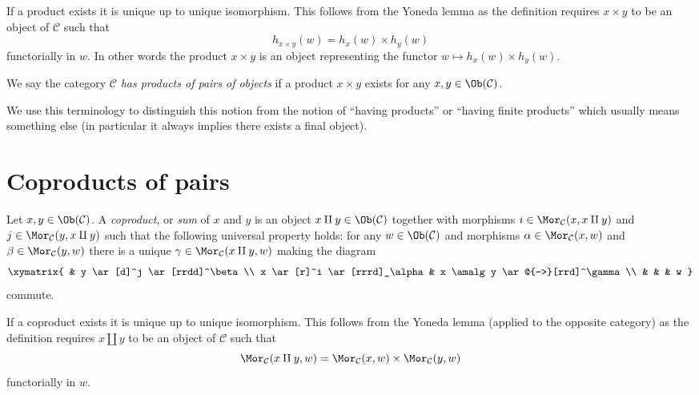 \noindent
If a product exists it is unique up to unique
isomorphism. This follows from the Yoneda lemma as
the definition requires $x \times y$ to be an object
of $\mathcal{C}$ such that
$$
h_{x \times y}(w) = h_x(w) \times h_y(w)
$$
functorially in $w$. In other words the product $x \times y$
is an object representing the functor
$w \mapsto h_x(w) \times h_y(w)$.

\begin{definition}
\label{definition-has-products-of-pairs}
We say the category $\mathcal{C}$ {\it has products of pairs
of objects} if a product $x \times y$
exists for any $x, y \in \Ob(\mathcal{C})$.
\end{definition}

\noindent
We use this terminology to distinguish this notion from the notion
of ``having products'' or ``having finite products'' which usually means
something else (in particular it always implies there exists a
final object).





\section{Coproducts of pairs}
\label{section-coproducts-pairs}

\begin{definition}
\label{definition-coproducts}
Let $x, y \in \Ob(\mathcal{C})$.
A {\it coproduct}, or {\it sum} of $x$ and $y$ is
an object $x \amalg y \in \Ob(\mathcal{C})$
together with morphisms
$i \in \Mor_{\mathcal C}(x, x \amalg y)$ and
$j \in \Mor_{\mathcal C}(y, x \amalg y)$ such
that the following universal property holds: for
any $w \in \Ob(\mathcal{C})$ and morphisms
$\alpha \in \Mor_{\mathcal C}(x, w)$ and
$\beta \in \Mor_\mathcal{C}(y, w)$
there is a unique
$\gamma \in \Mor_{\mathcal C}(x \amalg y, w)$ making
the diagram
$$
\xymatrix{
& y \ar[d]^j \ar[rrdd]^\beta \\
x \ar[r]^i \ar[rrrd]_\alpha & x \amalg y \ar@{-->}[rrd]^\gamma \\
& & & w
}
$$
commute.
\end{definition}

\noindent
If a coproduct exists it is unique up to unique
isomorphism. This follows from the Yoneda lemma (applied to the
opposite category) as
the definition requires $x \amalg y$ to be an object
of $\mathcal{C}$ such that
$$
\Mor_\mathcal{C}(x \amalg y, w) =
\Mor_\mathcal{C}(x, w) \times \Mor_\mathcal{C}(y, w)
$$
functorially in $w$.

